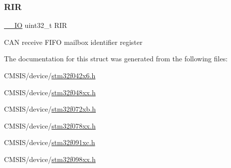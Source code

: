 \subsubsection{\texorpdfstring{R\+IR}{RIR}}
{\footnotesize\ttfamily \hyperlink{core__sc300_8h_aec43007d9998a0a0e01faede4133d6be}{\+\_\+\+\_\+\+IO} uint32\+\_\+t R\+IR}

C\+AN receive F\+I\+FO mailbox identifier register 

The documentation for this struct was generated from the following files\+:\begin{DoxyCompactItemize}
\item 
C\+M\+S\+I\+S/device/\hyperlink{stm32f042x6_8h}{stm32f042x6.\+h}\item 
C\+M\+S\+I\+S/device/\hyperlink{stm32f048xx_8h}{stm32f048xx.\+h}\item 
C\+M\+S\+I\+S/device/\hyperlink{stm32f072xb_8h}{stm32f072xb.\+h}\item 
C\+M\+S\+I\+S/device/\hyperlink{stm32f078xx_8h}{stm32f078xx.\+h}\item 
C\+M\+S\+I\+S/device/\hyperlink{stm32f091xc_8h}{stm32f091xc.\+h}\item 
C\+M\+S\+I\+S/device/\hyperlink{stm32f098xx_8h}{stm32f098xx.\+h}\end{DoxyCompactItemize}
